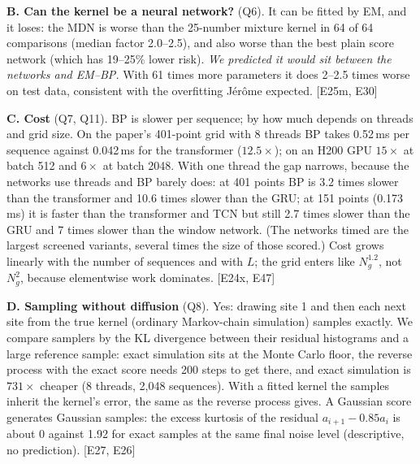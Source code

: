 \documentclass[11pt,a4paper]{article}
\newcommand{\src}[1]{{\footnotesize\color{gray}[#1]}}
\newcommand{\fals}[1]{{\small\itshape #1}}
\begin{document}
\textbf{B. Can the kernel be a neural network?} (Q6). It can be fitted by EM, and it loses: the MDN is worse than the 25-number
mixture kernel in 64 of 64 comparisons (median factor 2.0--2.5), and also worse than the best plain score network (which has
19--25\% lower risk). \fals{We predicted it would sit between the networks and EM--BP.} With 61 times more parameters it does 2--2.5 times worse on test data, consistent with the overfitting Jérôme expected. \src{E25m, E30}

\textbf{C. Cost} (Q7, Q11). BP is slower per sequence; by how much depends on threads and grid size. On the paper's 401-point grid
with 8 threads BP takes 0.52\,ms per sequence against 0.042\,ms for the transformer ($12.5\times$); on an H200 GPU $15\times$ at
batch 512 and $6\times$ at batch 2048. With one thread the gap narrows, because the networks use threads and BP barely does: at
401 points BP is 3.2 times slower than the transformer and 10.6 times slower than the GRU; at 151 points (0.173\,ms) it is faster
than the transformer and TCN but still 2.7 times slower than the GRU and 7 times slower than the window network. (The networks timed are
the largest screened variants, several times the size of those scored.) Cost grows linearly with the number of sequences and with $L$; the grid enters
like $N_g^{1.2}$, not $N_g^2$, because elementwise work dominates. \src{E24x, E47}

\textbf{D. Sampling without diffusion} (Q8). Yes: drawing site 1 and then each next site from the true kernel (ordinary Markov-chain
simulation) samples exactly. We compare samplers by the KL divergence between their residual histograms and a large reference
sample: exact simulation sits at the Monte Carlo floor, the reverse process with the exact score needs 200 steps to get there, and
exact simulation is $731\times$ cheaper (8 threads, 2,048 sequences). With a fitted kernel the samples inherit the kernel's error, the same as the reverse process gives. A Gaussian score
generates Gaussian samples: the excess kurtosis of the residual $a_{i+1}-0.85a_i$ is about 0 against 1.92 for exact samples at the same final noise
level (descriptive, no prediction). \src{E27, E26}
\end{document}
